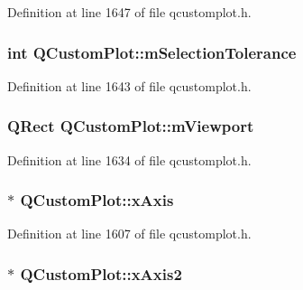 Definition at line 1647 of file qcustomplot.\-h.

\hypertarget{class_q_custom_plot_abc36e12dd0482117ad810a800c847722}{
\subsubsection[{m\-Selection\-Tolerance}]{\setlength{\rightskip}{0pt plus 5cm}int Q\-Custom\-Plot\-::m\-Selection\-Tolerance\hspace{0.3cm}{\ttfamily [protected]}}}\label{class_q_custom_plot_abc36e12dd0482117ad810a800c847722}


Definition at line 1643 of file qcustomplot.\-h.

\hypertarget{class_q_custom_plot_ac0a7c38a715526c257cff95774f83ab6}{
\subsubsection[{m\-Viewport}]{\setlength{\rightskip}{0pt plus 5cm}Q\-Rect Q\-Custom\-Plot\-::m\-Viewport\hspace{0.3cm}{\ttfamily [protected]}}}\label{class_q_custom_plot_ac0a7c38a715526c257cff95774f83ab6}


Definition at line 1634 of file qcustomplot.\-h.

\hypertarget{class_q_custom_plot_a968b5ac86c181a49bba78c2b62a80cb3}{
\subsubsection[{x\-Axis}]{$\ast$ Q\-Custom\-Plot\-::x\-Axis}}\label{class_q_custom_plot_a968b5ac86c181a49bba78c2b62a80cb3}


Definition at line 1607 of file qcustomplot.\-h.

\hypertarget{class_q_custom_plot_ada41599f22cad901c030f3dcbdd82fd9}{
\subsubsection[{x\-Axis2}]{ $\ast$ Q\-Custom\-Plot\-::x\-Axis2}}\label{class_q_custom_plot_ada41599f22cad901c030f3dcbdd82fd9}


